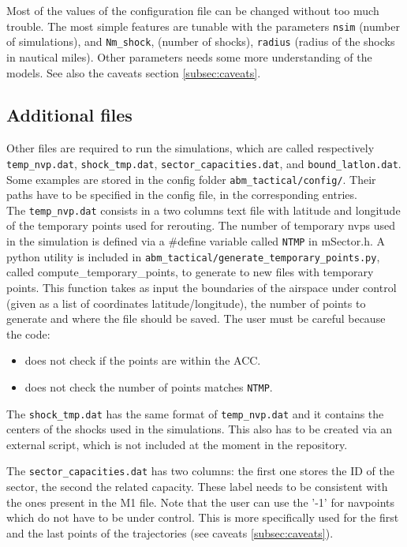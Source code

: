 \documentclass[12pt]{article}
\begin{document}
Most of the values of the configuration file can be changed without too much trouble. The most simple features are tunable with the parameters \verb|nsim| (number of simulations), and \verb|Nm_shock|, (number of shocks), \verb|radius| (radius of the shocks in nautical miles). Other parameters needs some more understanding of the models. See also the caveats section \ref{subsec:caveats}.


\subsection{Additional files}
Other files are required to run the simulations, which are called respectively \verb|temp_nvp.dat|, \verb|shock_tmp.dat|,  \verb|sector_capacities.dat|, and \verb|bound_latlon.dat|. Some examples are stored in the config folder \verb|abm_tactical/config/|. Their paths have to be specified in the config file, in the corresponding entries.\\

The \verb|temp_nvp.dat| consists in a two columns text file with latitude and longitude of the temporary points used for rerouting. The number of temporary nvps used in the simulation is defined via a \#define variable called \verb|NTMP| in mSector.h. A python utility is included in \verb|abm_tactical/generate_temporary_points.py|, called compute\_temporary\_points, to generate to new files with temporary points. This function takes as input the boundaries of the airspace under control (given as a list of coordinates latitude/longitude), the number of points to generate and  where the file should be saved. The user must be careful because the code:
\begin{itemize}
\item does not check if the points are within the ACC. 
\item does not check the number of points matches \verb|NTMP|.
\end{itemize}


The \verb|shock_tmp.dat| has the same format of \verb|temp_nvp.dat| and it contains the centers of the shocks used in the simulations. This also has to be created via an external script, which is not included at the moment in the repository.

The \verb|sector_capacities.dat| has two columns: the first one stores the ID of the sector, the second the related capacity. These label needs to be consistent with the ones present in the M1 file. Note that the user can use the '-1' for navpoints which do not have to be under control. This is more specifically used for the first and the last points of the trajectories (see caveats \ref{subsec:caveats}).
\end{document}
